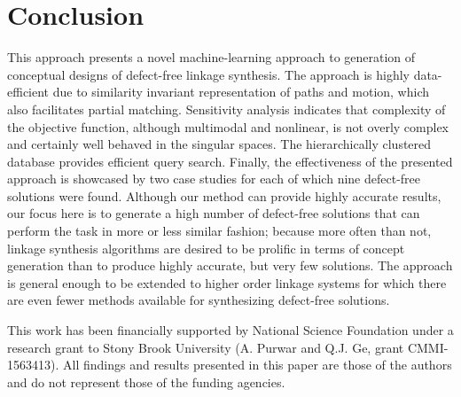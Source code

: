\documentclass[twocolumn,10pt]{asme2ej}
\begin{document}
\section*{Conclusion}
This approach presents a novel machine-learning approach to generation of conceptual designs of defect-free linkage synthesis.
The approach is highly data-efficient due to similarity invariant representation of paths and motion, which also facilitates partial matching.
Sensitivity analysis indicates that complexity of the objective function, although multimodal and nonlinear, is not overly complex and certainly well behaved in the singular spaces.
The hierarchically clustered database provides efficient query search.
Finally, the effectiveness of the presented approach is showcased by two case studies for each of which nine defect-free solutions were found.
Although our method can provide highly accurate results, our focus here is to generate a high number of defect-free solutions that can perform the task in more or less similar fashion;
because more often than not, linkage synthesis algorithms are desired to be prolific in terms of concept generation than to produce highly accurate, but very few solutions. The approach is general enough to be extended to higher order linkage systems for which there are even fewer methods available for synthesizing defect-free solutions.

\begin{acknowledgment}
This work has been financially supported by National Science Foundation under a research grant to Stony Brook University (A. Purwar and Q.J. Ge, grant CMMI-1563413). All findings and results presented in this paper are those of the authors and do not represent those of the funding agencies.
\end{acknowledgment}



\newpage
\clearpage
\listoftables
\listoffigures
\end{document}

